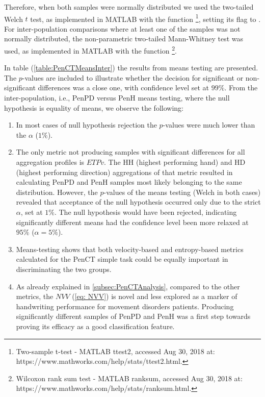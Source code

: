 Therefore, when both samples were normally distributed we used the two-tailed Welch $t$ test, as implemented in MATLAB with the function \footnote{Two-sample t-test - MATLAB ttest2, accessed Aug 30, 2018 at: https://www.mathworks.com/help/stats/ttest2.html.}, setting its  flag to . For inter-population comparisons where at least one of the samples was not normally distributed, the non-parametric two-tailed Mann-Whitney test was used, as implemented in MATLAB with the function \footnote{Wilcoxon rank sum test - MATLAB ranksum, accessed Aug 30, 2018 at: https://www.mathworks.com/help/stats/ranksum.html.}. 

In table (\ref{table:PenCTMeansInter}) the results from means testing are presented. The $p$-values are included to illustrate whether the decision for significant or non-significant differences was a close one, with confidence level set at $99\%$. From the inter-population, i.e., \gls{PenPD} versus \gls{PenH} means testing, where the null hypothesis is equality of means, we observe the following:
\begin{enumerate}
\item In most cases of null hypothesis rejection the $p$-values were much lower than the $\alpha$ ($1\%$).
\item The only metric not producing samples with significant differences for all aggregation profiles is $ETPv$. The HH (highest performing hand) and HD (highest performing direction) aggregations of that metric resulted in calculating \gls{PenPD} and \gls{PenH} samples most likely belonging to the same distribution. However, the $p$-values of the means testing (Welch in both cases) revealed that acceptance of the null hypothesis occurred only due to the strict $\alpha$, set at $1\%$. The null hypothesis would have been rejected, indicating significantly different means had the confidence level been more relaxed at $95\%$ ($\alpha = 5\%$). 
\item Means-testing shows that both velocity-based and entropy-based metrics calculated for the \gls{PenCT} simple task could be equally important in discriminating the two groups. 
\item As already explained in \ref{subsec:PenCTAnalysis}, compared to the other metrics, the $NVV$ (\ref{eq: NVV}) is novel and less explored as a marker of handwriting performance for movement disorders patients. Producing significantly different samples of \gls{PenPD} and \gls{PenH} was a first step towards proving its efficacy as a good classification feature. 
\end{enumerate}


